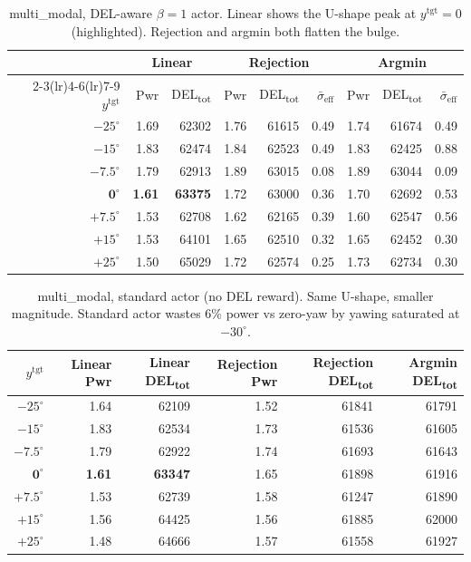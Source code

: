 \documentclass{article}
\begin{document}
\begin{table}[h]
\centering
\caption{multi\_modal, DEL-aware $\beta=1$ actor. Linear shows the U-shape peak at $y^{\mathrm{tgt}}=0$ (highlighted). Rejection and argmin both flatten the bulge.}
\label{tab:sweep_mm_delaware}
\small
\begin{tabular}{rrrrrrrrr}
\toprule
 & \multicolumn{2}{c}{Linear} & \multicolumn{3}{c}{Rejection} & \multicolumn{3}{c}{Argmin} \\
\cmidrule(lr){2-3}\cmidrule(lr){4-6}\cmidrule(lr){7-9}
$y^{\mathrm{tgt}}$ & Pwr & DEL\textsubscript{tot} & Pwr & DEL\textsubscript{tot} & $\bar\sigma_{\mathrm{eff}}$ & Pwr & DEL\textsubscript{tot} & $\bar\sigma_{\mathrm{eff}}$ \\
\midrule
$-25^\circ$ & 1.69 & 62302 & 1.76 & 61615 & 0.49 & 1.74 & 61674 & 0.49 \\
$-15^\circ$ & 1.83 & 62474 & 1.84 & 62523 & 0.49 & 1.83 & 62425 & 0.88 \\
$-7.5^\circ$ & 1.79 & 62913 & 1.89 & 63015 & 0.08 & 1.89 & 63044 & 0.09 \\
$\mathbf{0^\circ}$ & \textbf{1.61} & \textbf{63375} & 1.72 & 63000 & 0.36 & 1.70 & 62692 & 0.53 \\
$+7.5^\circ$ & 1.53 & 62708 & 1.62 & 62165 & 0.39 & 1.60 & 62547 & 0.56 \\
$+15^\circ$ & 1.53 & 64101 & 1.65 & 62510 & 0.32 & 1.65 & 62452 & 0.30 \\
$+25^\circ$ & 1.50 & 65029 & 1.72 & 62574 & 0.25 & 1.73 & 62734 & 0.30 \\
\bottomrule
\end{tabular}
\end{table}

\begin{table}[h]
\centering
\caption{multi\_modal, standard actor (no DEL reward). Same U-shape, smaller magnitude. Standard actor wastes 6\% power vs zero-yaw by yawing saturated at $-30^\circ$.}
\label{tab:sweep_mm_std}
\small
\begin{tabular}{rrrrrr}
\toprule
$y^{\mathrm{tgt}}$ & Linear Pwr & Linear DEL\textsubscript{tot} & Rejection Pwr & Rejection DEL\textsubscript{tot} & Argmin DEL\textsubscript{tot} \\
\midrule
$-25^\circ$ & 1.64 & 62109 & 1.52 & 61841 & 61791 \\
$-15^\circ$ & 1.83 & 62534 & 1.73 & 61536 & 61605 \\
$-7.5^\circ$ & 1.79 & 62922 & 1.74 & 61693 & 61643 \\
$\mathbf{0^\circ}$ & \textbf{1.61} & \textbf{63347} & 1.65 & 61898 & 61916 \\
$+7.5^\circ$ & 1.53 & 62739 & 1.58 & 61247 & 61890 \\
$+15^\circ$ & 1.56 & 64425 & 1.56 & 61885 & 62000 \\
$+25^\circ$ & 1.48 & 64666 & 1.57 & 61558 & 61927 \\
\bottomrule
\end{tabular}
\end{table}
\end{document}
